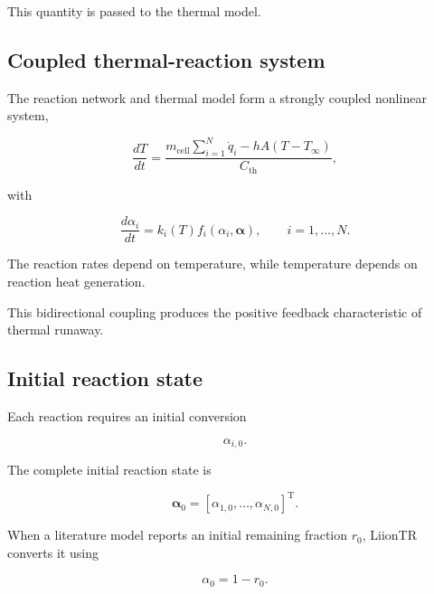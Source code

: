This quantity is passed to the thermal model.


\subsection{Coupled thermal-reaction system}

The reaction network and thermal model form a strongly coupled
nonlinear system,

\begin{equation}
    \frac{dT}{dt}
    =
    \frac{
        m_{\mathrm{cell}}
        \displaystyle\sum_{i=1}^{N}
        \dot{q}_i
        -
        hA
        \left(
            T-T_{\infty}
        \right)
    }{
        C_{\mathrm{th}}
    },
    \label{eq:coupled_temperature}
\end{equation}

with

\begin{equation}
    \frac{d\alpha_i}{dt}
    =
    k_i(T)
    f_i
    \left(
        \alpha_i,
        \boldsymbol{\alpha}
    \right),
    \qquad
    i=1,\ldots,N.
    \label{eq:coupled_reactions}
\end{equation}

The reaction rates depend on temperature, while temperature depends on
reaction heat generation.

This bidirectional coupling produces the positive feedback characteristic
of thermal runaway.


\subsection{Initial reaction state}

Each reaction requires an initial conversion

\begin{equation}
    \alpha_{i,0}.
\end{equation}

The complete initial reaction state is

\begin{equation}
    \boldsymbol{\alpha}_0
    =
    \left[
        \alpha_{1,0},
        \ldots,
        \alpha_{N,0}
    \right]^{\mathrm{T}}.
\end{equation}

When a literature model reports an initial remaining fraction $r_0$,
LiionTR converts it using

\begin{equation}
    \alpha_0
    =
    1-r_0.
    \label{eq:remaining_to_conversion}
\end{equation}


